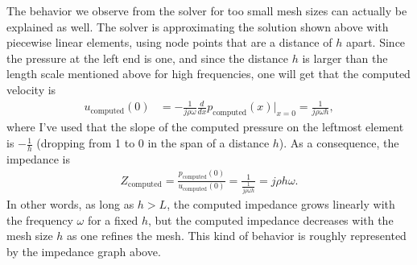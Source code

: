\documentclass{article}
\begin{document}
The behavior we observe from the solver for too small mesh sizes can
actually be explained as well. The solver is approximating the
solution shown above with piecewise linear elements, using node points
that are a distance of $h$ apart. Since the pressure at the left end
is one, and since the distance $h$ is larger than the length scale
mentioned above for high frequencies, one will get that the computed
velocity is
\begin{align*}
  u_\text{computed}(0)
  &=
  -\frac{1}{j\rho\omega} \frac{d}{dx} p_\text{computed}(x)|_{x=0}
  = \frac{1}{j\rho\omega h},
\end{align*}
where I've used that the slope of the computed pressure on the
leftmost element is $-\frac{1}{h}$ (dropping from 1 to 0 in the span
of a distance $h$). As a consequence, the impedance is
\begin{align*}
  Z_\text{computed} = \frac{p_\text{computed}(0)}{u_\text{computed}(0)}
  = \frac{1}{\frac{1}{j\rho\omega h}}
  = j\rho h \omega.
\end{align*}
In other words, as long as $h>L$, the computed impedance grows
linearly with the frequency $\omega$ for a fixed $h$, but the computed
impedance decreases with the mesh size $h$ as one refines the
mesh. This kind of behavior is roughly represented by the impedance
graph above.
\end{document}
